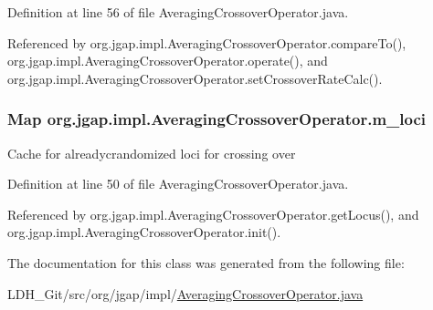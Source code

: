 Definition at line 56 of file Averaging\-Crossover\-Operator.\-java.



Referenced by org.\-jgap.\-impl.\-Averaging\-Crossover\-Operator.\-compare\-To(), org.\-jgap.\-impl.\-Averaging\-Crossover\-Operator.\-operate(), and org.\-jgap.\-impl.\-Averaging\-Crossover\-Operator.\-set\-Crossover\-Rate\-Calc().

\hypertarget{classorg_1_1jgap_1_1impl_1_1_averaging_crossover_operator_ab8eb15d0c67e895208ff78dd426f5213}{
\subsubsection[{m\-\_\-loci}]{\setlength{\rightskip}{0pt plus 5cm}Map org.\-jgap.\-impl.\-Averaging\-Crossover\-Operator.\-m\-\_\-loci\hspace{0.3cm}{\ttfamily [private]}}}\label{classorg_1_1jgap_1_1impl_1_1_averaging_crossover_operator_ab8eb15d0c67e895208ff78dd426f5213}
Cache for alreadycrandomized loci for crossing over 

Definition at line 50 of file Averaging\-Crossover\-Operator.\-java.



Referenced by org.\-jgap.\-impl.\-Averaging\-Crossover\-Operator.\-get\-Locus(), and org.\-jgap.\-impl.\-Averaging\-Crossover\-Operator.\-init().



The documentation for this class was generated from the following file\-:\begin{DoxyCompactItemize}
\item 
L\-D\-H\-\_\-\-Git/src/org/jgap/impl/\hyperlink{_averaging_crossover_operator_8java}{Averaging\-Crossover\-Operator.\-java}\end{DoxyCompactItemize}
